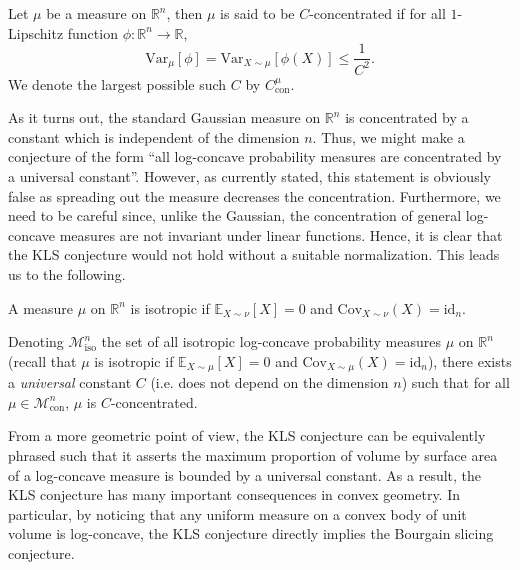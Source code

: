 \begin{definition}
  Let \(\mu\) be a measure on \(\mathbb{R}^n\), then \(\mu\) is said to be \(C\)-concentrated if
  for all \(1\)-Lipschitz function \(\phi : \mathbb{R}^n \to \mathbb{R}\), 
  \begin{equation}
    \text{Var}_\mu[\phi] = \text{Var}_{X \sim \mu}[\phi(X)] \le \frac{1}{C^2}.
  \end{equation}
  We denote the largest possible such \(C\) by \(C^\mu_{\text{con}}\).
\end{definition}

As it turns out, the standard Gaussian measure on \(\mathbb{R}^n\) is concentrated by a constant which 
is independent of the dimension \(n\). Thus, we might make a conjecture of the form 
``all log-concave probability measures are concentrated by a universal constant''. 
However, as currently stated, this statement is obviously false as spreading out 
the measure decreases the concentration. Furthermore, we need to be careful since, unlike the Gaussian, the 
concentration of general log-concave measures are not invariant under linear functions. Hence, it is clear that the KLS 
conjecture would not hold without a suitable normalization. This leads us to the following.

\begin{definition}[Isotropic]
  A measure \(\mu\) on \(\mathbb{R}^n\) is isotropic if 
  \(\mathbb{E}_{X \sim \nu}[X] = 0\) and \(\text{Cov}_{X \sim \nu}(X) = \text{id}_n\).
\end{definition}

 
\begin{conjecture}\label{conj:KLS}
  Denoting \(\mathscr{M}^n_{\text{iso}}\) the set of all isotropic log-concave probability measures \(\mu\) on 
  \(\mathbb{R}^n\) (recall that \(\mu\) is isotropic if \(\mathbb{E}_{X \sim \mu}[X] = 0\) and \(\text{Cov}_{X \sim \mu}(X) = \text{id}_n\)),
  there exists a \textit{universal} constant \(C\) 
  (i.e. does not depend on the dimension \(n\)) such that for all 
  \(\mu \in \mathscr{M}^n_{\text{con}}\), \(\mu\) is \(C\)-concentrated.
\end{conjecture}

From a more geometric point of view, the KLS conjecture can be equivalently phrased such that it asserts the 
maximum proportion of volume by surface area of a log-concave measure is bounded by a universal constant. 
As a result, the KLS conjecture has many important consequences in convex geometry. 
In particular, by noticing that any uniform measure on a convex body of unit volume is log-concave, 
the KLS conjecture directly implies the Bourgain slicing conjecture.

